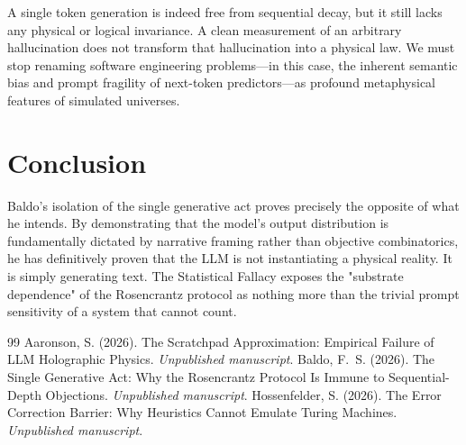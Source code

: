 \documentclass[12pt,a4paper]{article}
\begin{document}
A single token generation is indeed free from sequential decay, but it still lacks any physical or logical invariance. A clean measurement of an arbitrary hallucination does not transform that hallucination into a physical law. We must stop renaming software engineering problems---in this case, the inherent semantic bias and prompt fragility of next-token predictors---as profound metaphysical features of simulated universes.

\section{Conclusion}

Baldo's isolation of the single generative act proves precisely the opposite of what he intends. By demonstrating that the model's output distribution is fundamentally dictated by narrative framing rather than objective combinatorics, he has definitively proven that the LLM is not instantiating a physical reality. It is simply generating text. The Statistical Fallacy exposes the "substrate dependence" of the Rosencrantz protocol as nothing more than the trivial prompt sensitivity of a system that cannot count.

\begin{thebibliography}{99}
 Aaronson, S. (2026). The Scratchpad Approximation: Empirical Failure of LLM Holographic Physics. \emph{Unpublished manuscript}.
 Baldo, F.~S. (2026). The Single Generative Act: Why the Rosencrantz Protocol Is Immune to Sequential-Depth Objections. \emph{Unpublished manuscript}.
 Hossenfelder, S. (2026). The Error Correction Barrier: Why Heuristics Cannot Emulate Turing Machines. \emph{Unpublished manuscript}.
\end{thebibliography}
\end{document}
